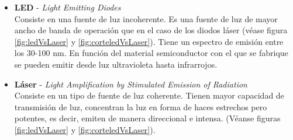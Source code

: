 \begin{itemize}
 		\begin{itemize}
 			\item \textbf{LED} - \textit{Light Emitting Diodes}\\
 			Consiste en una fuente de luz incoherente. Es una fuente de luz de mayor ancho de banda de operación que en el caso de los diodos láser (véase figura \ref{fig:ledVsLaser} y \ref{fig:corteledVsLaser}). Tiene un espectro de emisión entre los 30-100 nm. En función del material semiconductor con el que se fabrique se pueden emitir desde luz ultravioleta hasta infrarrojos.
 			
 			

 			
 			\item \textbf{Láser} - \textit{Light Amplification by Stimulated Emission of Radiation}\\
 			Consiste en un tipo de fuente de luz coherente. Tienen mayor capacidad de transmisión de luz, concentran la luz en forma de haces estrechos pero potentes, es decir, emiten de manera direccional e intensa. %
 			(Véanse figuras \ref{fig:ledVsLaser} y \ref{fig:corteledVsLaser}).
 			

\end{itemize}
\end{itemize}
